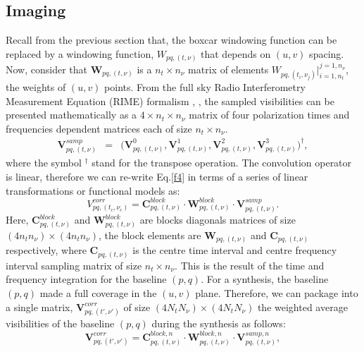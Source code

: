\documentclass[useAMS,usenatbib]{mn2e}
\begin{document}
\subsection{Imaging}
\label{sec:imaging}
Recall from the previous section that, the boxcar windowing function can be replaced by a windowing function, $W_{pq,(t,\nu)}$ that depends 
on $(u,v)$ spacing. Now, consider that $\mathcal{\textbf{W}}_{pq,(t,\nu)}$ is a $n_t \times n_{\nu}$ matrix of elements 
$W_{pq,(t_i,\nu_j)}|_{i=1,n_t}^{j=1, n_{\nu}}$, the weights of $(u,v)$ points. From the full sky Radio Interferometry Measurement Equation 
(RIME) formalism \citep{smirnov2011revisiting}, \citep{smirnov2011revisiting}, the sampled visibilities can be presented mathematically as 
a $4\times 
n_t\times n_{\nu}$ matrix of four polarization times and 
frequencies dependent matrices each of size $n_t\times n_{\nu}$.
\begin{eqnarray*}
\mathbf{V}_{pq,(t,\nu)}^{samp}&=&\Bigg(\mathbf{V}_{pq,(t,\nu)}^{0},\mathbf { V } 
^1_{pq,(t,\nu)},\mathbf{V}^2_{pq,(t,\nu)},\mathbf{V}_{pq,(t,\nu)}^{3 } \Bigg)^{\dagger}, \label{eqx:conv}
\end{eqnarray*}
where the symbol $^{\dagger}$ stand for the transpose operation. The convolution operator is linear, therefore we can re-write Eq.\ref{f4} 
in terms of a series of linear transformations or functional models as:
\begin{equation}
V_{pq,(t_c,\nu_c)}^{corr}= \mathbf{C}_{pq,(t,\nu)}^{block}\cdot\mathbf{W}_{pq,(t,\nu)}^{block}\cdot 
\mathbf{V}_{pq,(t,\nu)}^{samp}.\label{eqbb:linear}
\end{equation}
Here, $\mathbf{C}_{pq,(t,\nu)}^{block}$ and $\mathbf{W}_{pq,(t,\nu)}^{block}$ are  blocks diagonals matrices of size $(4n_t 
n_{\nu})\times(4n_t n_{\nu})$, the block elements are $\mathcal{\textbf{W}}_{pq,(t,\nu)}$ and $\mathbf{C}_{pq,(t,\nu)}$ 
respectively, where $\mathbf{C}_{pq,(t,\nu)}$ is the centre time interval and centre frequency interval sampling matrix of size $n_t\times 
n_{\nu}$. This
is the result of the time and frequency integration for the baseline $(p,q)$.
For a synthesis, the baseline $(p,q)$ made a full coverage in the $(u,v)$ plane. Therefore, we can  
package into a single matrix, $\mathbf{V}_{pq,(t',\nu')}^{corr}$ of size $(4N_t N_{\nu})\times (4N_t N_{\nu})$ the 
weighted average visibilities of the  baseline $(p,q)$ during the synthesis as follows: 
\begin{equation}
\mathbf{V}_{pq,(t',\nu')}^{corr}=\mathbf{C}_{pq,(t,\nu)}^{block,n}\cdot 
\mathbf{W}_{pq,(t,\nu)}^{block,n}\cdot\mathbf{V}_{pq,(t,\nu)}^{samp,n},\label{eq2:block}
\end{equation}
\end{document}
